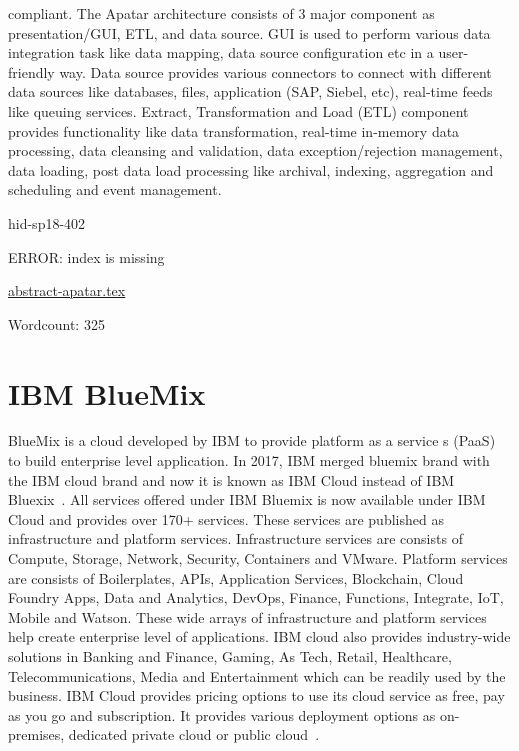compliant. The Apatar architecture consists of 3 major component as
presentation/GUI, ETL, and data source. GUI is used to perform various
data integration task like data mapping, data source configuration etc
in a user-friendly way. Data source provides various connectors to
connect with different data sources like databases, files,
application (SAP, Siebel, etc), real-time feeds like queuing
services. Extract, Transformation and Load (ETL) component provides
functionality like data transformation, real-time in-memory data
processing, data cleansing and validation, data exception/rejection
management, data loading, post data load processing like archival,
indexing, aggregation and scheduling and event management.


\begin{IU}

hid-sp18-402

ERROR: index is missing

\href{https://github.com/cloudmesh-community/hid-sp18-402/blob/master//technology/abstract-apatar.tex}{abstract-apatar.tex}

 

Wordcount: 325

\end{IU}

\section{IBM BlueMix}
BlueMix is a cloud developed by IBM to provide platform as a service
s (PaaS) to build enterprise level application. In 2017, IBM merged
bluemix brand with the IBM cloud brand and now it is known as IBM
Cloud instead of IBM Bluexix~\cite{hid-sp18-402-www-ibm-blog}. All
services offered under IBM Bluemix is now available under IBM Cloud
and provides over 170+ services. These services are published as
infrastructure and platform services. Infrastructure services are
consists of Compute, Storage, Network, Security, Containers and
VMware. Platform services are consists of Boilerplates, APIs,
Application Services, Blockchain, Cloud Foundry Apps, Data and
Analytics, DevOps, Finance, Functions, Integrate, IoT, Mobile and
Watson. These wide arrays of infrastructure and platform services help
create enterprise level of applications. IBM cloud also provides
industry-wide solutions in Banking and Finance, Gaming, As Tech,
Retail, Healthcare, Telecommunications, Media and Entertainment which
can be readily used by the business. IBM Cloud provides pricing
options to use its cloud service as free, pay as you go and
subscription. It provides various deployment options as on-premises,
dedicated private cloud or public cloud~\cite{hid-sp18-402-www-ibm}.


